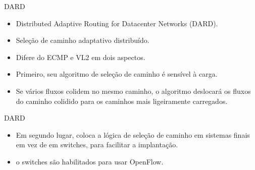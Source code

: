 \documentclass[aspectratio=169]{beamer}
\begin{document}
  \begin{frame} {DARD}
	      				
		
    \begin{itemize}
        \normalsize
        \item
        Distributed Adaptive Routing for Datacenter
        Networks (DARD).
        \item
		     				
		   	Seleção de caminho adaptativo distribuído.
        
         \item
         	Difere do ECMP e VL2 em dois aspectos.
          \item
             Primeiro, seu algoritmo de seleção de caminho é sensível à carga.
		   \item
		  	Se vários fluxos colidem no mesmo caminho, o algoritmo
		  	deslocará os fluxos do caminho colidido para os caminhos mais ligeiramente carregados.
		  	 
    \end{itemize}
       
              
  \end{frame}      
    
    
    
   
     \begin{frame} {DARD}
   	      				
   		
       \begin{itemize}
           \normalsize
           \item
           Em segundo lugar, coloca a lógica de seleção de caminho em sistemas finais em vez de em
           switches, para facilitar a implantação.
          
   		     				
           
            \item
				o switches são habilitados para usar OpenFlow.
       \end{itemize}
          
                 
     \end{frame}    
 
 

    
    
\end{document}
